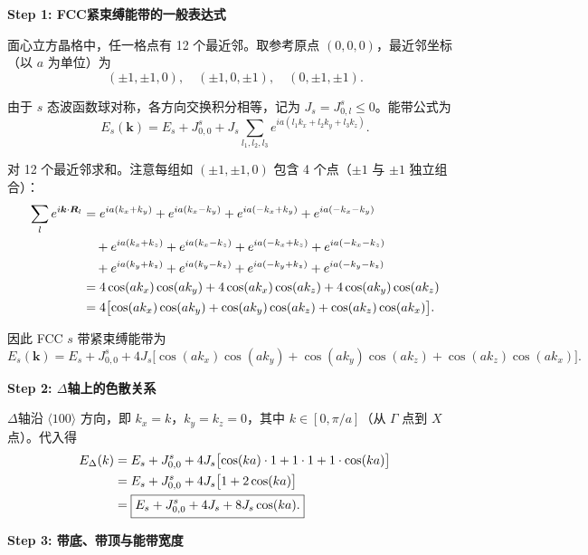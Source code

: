\begin{derivationbox}[标准解题过程]
\textbf{Step 1: FCC紧束缚能带的一般表达式}

面心立方晶格中，任一格点有 12 个最近邻。取参考原点 $(0,0,0)$，最近邻坐标（以 $a$ 为单位）为
\[
(\pm1,\pm1,0),\quad (\pm1,0,\pm1),\quad (0,\pm1,\pm1).
\]

由于 $s$ 态波函数球对称，各方向交换积分相等，记为 $J_s=J_{0,l}^{s}\le 0$。能带公式为
\begin{equation}
E_s(\bm{k}) = E_s + J_{0,0}^{s} + J_s\sum_{l_1,l_2,l_3}e^{ia(l_1k_x+l_2k_y+l_3k_z)}.
\end{equation}

对 12 个最近邻求和。注意每组如 $(\pm1,\pm1,0)$ 包含 4 个点（$\pm1$ 与 $\pm1$ 独立组合）：
\begin{align}
\sum_l e^{i\bm{k}\cdot\bm{R}_l}
&= e^{ia(k_x+k_y)} + e^{ia(k_x-k_y)} + e^{ia(-k_x+k_y)} + e^{ia(-k_x-k_y)} \notag\\
&\quad + e^{ia(k_x+k_z)} + e^{ia(k_x-k_z)} + e^{ia(-k_x+k_z)} + e^{ia(-k_x-k_z)} \notag\\
&\quad + e^{ia(k_y+k_z)} + e^{ia(k_y-k_z)} + e^{ia(-k_y+k_z)} + e^{ia(-k_y-k_z)} \notag\\
&= 4\cos(ak_x)\cos(ak_y) + 4\cos(ak_x)\cos(ak_z) + 4\cos(ak_y)\cos(ak_z) \notag\\
&= 4\bigl[\cos(ak_x)\cos(ak_y) + \cos(ak_y)\cos(ak_z) + \cos(ak_z)\cos(ak_x)\bigr].
\end{align}

因此 FCC $s$ 带紧束缚能带为
\begin{equation}
\boxed{E_s(\bm{k}) = E_s + J_{0,0}^{s} + 4J_s\bigl[\cos(ak_x)\cos(ak_y) + \cos(ak_y)\cos(ak_z) + \cos(ak_z)\cos(ak_x)\bigr].}
\end{equation}

\textbf{Step 2: $\Delta$轴上的色散关系}

$\Delta$轴沿 $\langle100\rangle$ 方向，即 $k_x=k$，$k_y=k_z=0$，其中 $k\in[0,\pi/a]$（从 $\Gamma$ 点到 $X$ 点）。代入得
\begin{align}
E_{\Delta}(k)
&= E_s + J_{0,0}^{s} + 4J_s\bigl[\cos(ka)\cdot 1 + 1\cdot 1 + 1\cdot\cos(ka)\bigr] \notag\\
&= E_s + J_{0,0}^{s} + 4J_s\bigl[1 + 2\cos(ka)\bigr] \notag\\
&= \boxed{E_s + J_{0,0}^{s} + 4J_s + 8J_s\cos(ka).}
\end{align}

\textbf{Step 3: 带底、带顶与能带宽度}


\end{derivationbox}
